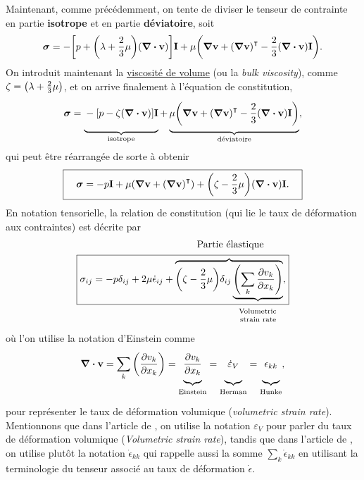 \documentclass[10pt]{article}
\numberwithin{equation}{section}
\newcommand{\vv}{\vb{v}}
\newcommand{\tall}{\vphantom{pA^{x^x}_p}}
\newcommand{\venti}{\vphantom{\sum_x^x}}
\newcommand{\pt}{\hspace{1pt}} %
\begin{document}
Maintenant, comme précédemment, on tente de diviser le tenseur de contrainte en partie \textbf{isotrope} et en partie \textbf{déviatoire}, soit
\begin{equation}
   \boldsymbol{\sigma} = -\qty[p + \qty(\lambda + \frac{2}{3}\mu)\qty(\divergence{\vv})]\mathbf{I} + \mu\qty(\gradient{\vv} + \qty(\gradient{\vv})^\intercal - \frac{2}{3}\qty(\divergence{\vv})\mathbf{I}).
\end{equation}
On introduit maintenant la \href{https://en.wikipedia.org/wiki/Volume\_viscosity}{viscosité de volume} (ou la \emph{bulk viscosity}), comme \(\zeta = \qty(\lambda + \frac{2}{3}\mu)\), et on arrive finalement à l'équation de constitution,
\begin{equation}
   \boldsymbol{\sigma} = \underbrace{\venti-\qty[p - \zeta\qty(\divergence{\vv})]\mathbf{I}}_\text{isotrope}
   +\underbrace{\venti\mu\qty(\gradient{\vv} + \qty(\gradient{\vv})^\intercal - \frac{2}{3}\qty(\divergence{\vv})\mathbf{I})}_\text{déviatoire},
\end{equation}
qui peut être réarrangée de sorte à obtenir
\begin{equation}
   \boxed{\quad\boldsymbol{\sigma} = -p\mathbf{I} + \mu\qty(\gradient{\vv} + \qty(\gradient{\vv})^\intercal) + \qty(\zeta - \frac{2}{3}\mu)\qty(\divergence{\vv})\mathbf{I}.\quad}
\end{equation}
En notation tensorielle, la relation de constitution (qui lie le taux de déformation aux contraintes) est décrite par
\begin{align}
\label{eq:orgb90e044}
   & \hspace{4.3cm}\text{Partie élastique}\nonumber\\
   &\boxed{\sigma_{ij} = -p\delta_{ij} + 2\mu\dot{\epsilon}_{ij} + \overbrace{\qty(\zeta-\frac{2}{3}\mu) \delta_{ij}\underbrace{\qty(\sum_k\pdv{v_k}{x_k})}},}\\
   & \hspace{5.8cm}\substack{\text{Volumetric}\\ \tall\pt\text{strain rate}}\nonumber
\end{align}
où l'on utilise la notation d'Einstein comme
\begin{equation}
   \divergence{\vv} = \sum_k \qty(\pdv{v_k}{x_k}) =
   \underbrace{\pdv{v_k}{x_k}\venti}_{\tall\text{Einstein}} =
   \underbrace{\venti\dot{\varepsilon}_V}_{\tall\text{Herman}} =
   \underbrace{\venti\epsilon_{kk}}_{\tall\text{Hunke}},
\end{equation}
pour représenter le taux de déformation volumique (\emph{volumetric strain rate}).
Mentionnons que dans l'article de \Textcite{herman2022granular}, on utilise la notation \(\varepsilon_V\) pour parler du taux de déformation volumique (\emph{Volumetric strain rate}), tandis que dans l'article de \Textcite{hunke1997elastic}, on utilise plutôt la notation \(\dot{\epsilon}_{kk}\) qui rappelle aussi la somme \(\sum_k \dot{\epsilon}_{kk}\) en utilisant la terminologie du tenseur associé au taux de déformation \(\dot{\epsilon}\).\bigskip
\end{document}
